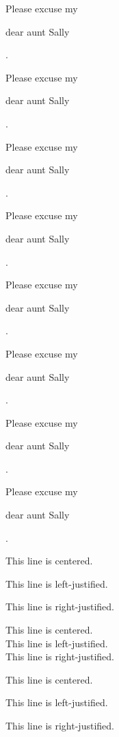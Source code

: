 \documentclass[10pt, letterpaper]{article}
\begin{document}
Please excuse my \begin{large}dear aunt Sally\end{large}.

Please excuse my \begin{Large}dear aunt Sally\end{Large}.

Please excuse my \begin{huge} dear aunt Sally\end{huge}.

Please excuse my \begin{Huge} dear aunt Sally\end{Huge}.

\vspace{1cm} 

Please excuse my \begin{normalsize} dear aunt Sally\end{normalsize}. 

Please excuse my \begin{small} dear aunt Sally\end{small}.

Please excuse my \begin{scriptsize} dear aunt Sally\end{scriptsize}. 

Please excuse my \begin{tiny} dear aunt Sally\end{tiny}. 

\begin{center}
This line is centered.
\end{center}

\begin{flushleft}
This line is left-justified.
\end{flushleft}

\begin{flushright}
This line is right-justified.
\end{flushright}

\centering
This line is centered. \\
This line is left-justified.\\
This line is right-justified.

\vspace{1 cm}

\Large
This line is centered. 

This line is left-justified.

This line is right-justified.
\end{document}
